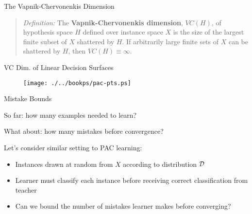 \documentclass[%
pdf,
colorBG,
slideColor,
tcrico,
]{prosper}
\begin{document}


\begin{slide}{The Vapnik-Chervonenkis Dimension }


\begin{quote}
{\em Definition:} The {\bf Vapnik-Chervonenkis dimension}, $VC(H)$, of
hypothesis space $H$ defined over instance space $X$ is the size of the
largest finite subset of $X$ shattered by $H$.  If arbitrarily large finite
sets of $X$ can be shattered by $H$, then $VC(H) \equiv \infty$.
\end{quote}
\end{slide}


\begin{slide}{VC Dim. of Linear Decision Surfaces }

\begin{figure}		
		\texttt{[image: ./../bookps/pac-pts.ps]}
	\end{figure}
\end{slide}


\begin{slide}{Mistake Bounds }

So far: how many examples needed to learn?

\vspace*{.1in}
What about: how many mistakes before convergence?


\vspace*{.2in}

Let's consider similar setting to PAC learning:
\begin{itemize}
\item Instances drawn at random from $X$ according to distribution ${\cal D}$
\item Learner must classify each instance before receiving correct
classification from teacher
\item Can we bound the number of mistakes learner makes before converging?
\end{itemize}
\end{slide}

\end{document}
